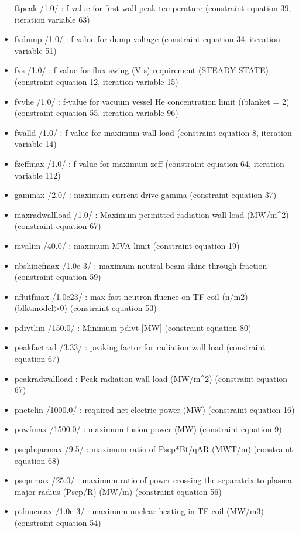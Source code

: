 \documentclass[]{article}
\begin{document}
\begin{itemize}
  ftpeak /1.0/ : f-value for first wall peak temperature (constraint
  equation 39, iteration variable 63)
\item
  fvdump /1.0/ : f-value for dump voltage (constraint equation 34,
  iteration variable 51)
\item
  fvs /1.0/ : f-value for flux-swing (V-s) requirement (STEADY STATE)
  (constraint equation 12, iteration variable 15)
\item
  fvvhe /1.0/ : f-value for vacuum vessel He concentration limit
  (iblanket = 2) (constraint equation 55, iteration variable 96)
\item
  fwalld /1.0/ : f-value for maximum wall load (constraint equation 8,
  iteration variable 14)
\item
  fzeffmax /1.0/ : f-value for maximum zeff (constraint equation 64,
  iteration variable 112)
\item
  gammax /2.0/ : maximum current drive gamma (constraint equation 37)
\item
  maxradwallload /1.0/ : Maximum permitted radiation wall load
  (MW/m\^{}2) (constraint equation 67)
\item
  mvalim /40.0/ : maximum MVA limit (constraint equation 19)
\item
  nbshinefmax /1.0e-3/ : maximum neutral beam shine-through fraction
  (constraint equation 59)
\item
  nflutfmax /1.0e23/ : max fast neutron fluence on TF coil (n/m2)
  (blktmodel\textgreater{}0) (constraint equation 53)
\item
  pdivtlim /150.0/ : Minimum pdivt {[}MW{]} (constraint equation 80)
\item
  peakfactrad /3.33/ : peaking factor for radiation wall load
  (constraint equation 67)
\item
  peakradwallload : Peak radiation wall load (MW/m\^{}2) (constraint
  equation 67)
\item
  pnetelin /1000.0/ : required net electric power (MW) (constraint
  equation 16)
\item
  powfmax /1500.0/ : maximum fusion power (MW) (constraint equation 9)
\item
  psepbqarmax /9.5/ : maximum ratio of Psep*Bt/qAR (MWT/m) (constraint
  equation 68)
\item
  pseprmax /25.0/ : maximum ratio of power crossing the separatrix to
  plasma major radius (Psep/R) (MW/m) (constraint equation 56)
\item
  ptfnucmax /1.0e-3/ : maximum nuclear heating in TF coil (MW/m3)
  (constraint equation 54)

\end{itemize}
\end{document}
